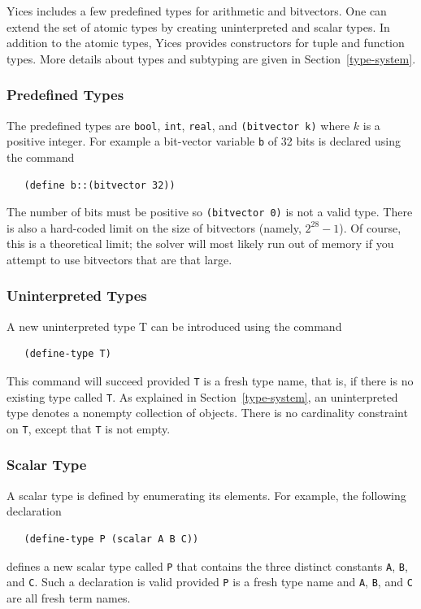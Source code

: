 \documentclass[11pt,twoside,fleqn,openright,titlepage]{cslreport}
\begin{document}
Yices includes a few predefined types for arithmetic and
bitvectors. One can extend the set of atomic types by creating
uninterpreted and scalar types. In addition to the atomic types, Yices
provides constructors for tuple and function types. More details about
types and subtyping are given in Section~\ref{type-system}.

\subsubsection*{Predefined Types}

The predefined  types are \texttt{bool},  \texttt{int}, \texttt{real},
and  \texttt{(bitvector  k)} where  $k$  is  a  positive integer.  For
example a bit-vector variable \texttt{b}  of 32 bits is declared using
the command
\begin{small}
\begin{verbatim}
   (define b::(bitvector 32))
\end{verbatim}
\end{small}
The number of bits must be positive so \texttt{(bitvector 0)} is not a
valid  type.   There  is  also  a hard-coded  limit  on  the  size  of
bitvectors (namely, $2^{28}  - 1$).  Of course, this  is a theoretical
limit; the solver will most likely run out of memory if you attempt to
use bitvectors that are that large.

\subsubsection*{Uninterpreted Types}

A new uninterpreted type T can be introduced using the command
\begin{small}
\begin{verbatim}
   (define-type T)
\end{verbatim}
\end{small}
This command  will succeed provided  \texttt{T} is a fresh  type name,
that is, if there is no existing type called \texttt{T}.  As explained
in Section~\ref{type-system}, an uninterpreted type denotes a nonempty
collection  of  objects.   There   is  no  cardinality  constraint  on
\texttt{T}, except that \texttt{T} is not empty.

\subsubsection*{Scalar Type}

A scalar type is defined by enumerating its elements. For example, the
following declaration
\begin{small}
\begin{verbatim}
   (define-type P (scalar A B C))
\end{verbatim}
\end{small}
defines a  new scalar type  called \texttt{P} that contains  the three
distinct  constants  \texttt{A}, \texttt{B},  and  \texttt{C}. Such  a
declaration  is valid  provided \texttt{P}  is a  fresh type  name and
\texttt{A}, \texttt{B}, and \texttt{C} are all fresh term names.
\end{document}
